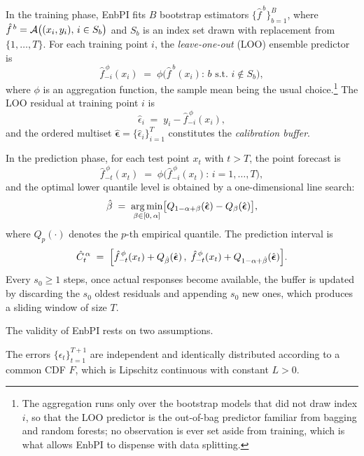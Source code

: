 In the training phase, EnbPI fits $B$ bootstrap estimators
$\{\hat{f}^{\,b}\}_{b=1}^B$, where
$\hat{f}^{\,b} = \mathcal{A}\bigl((x_i,y_i),\, i\in S_b\bigr)$ and $S_b$ is
an index set drawn with replacement from $\{1,\ldots,T\}$.
For each training point $i$, the \emph{leave-one-out} (LOO) ensemble
predictor is
\[
  \hat{f}_{-i}^{\,\phi}(x_i)
  \;=\;
  \phi\!\bigl(\hat{f}^{\,b}(x_i):\, b \text{ s.t. } i \notin S_b\bigr),
\]
where $\phi$ is an aggregation function, the sample mean being the
usual choice.\footnote{The aggregation runs only over the bootstrap
models that did not draw index $i$, so that the LOO predictor is the
out-of-bag predictor familiar from bagging and random forests; no
observation is ever set aside from training, which is what allows
EnbPI to dispense with data splitting.}
The LOO residual at training point $i$ is
\[
  \hat{\epsilon}_i \;=\; y_i - \hat{f}_{-i}^{\,\phi}(x_i),
\]
and the ordered multiset
$\hat{\boldsymbol\epsilon} = \{\hat{\epsilon}_i\}_{i=1}^T$
constitutes the \emph{calibration buffer}.

In the prediction phase, for each test point $x_t$ with $t > T$, the
point forecast is
\[
  \hat{f}_{-t}^{\,\phi}(x_t)
  \;=\;
  \phi\!\bigl(\hat{f}_{-i}^{\,\phi}(x_t):\, i = 1,\ldots,T\bigr),
\]
and the optimal lower quantile level is obtained by a
one-dimensional line search:
\[
  \hat{\beta}
  \;=\;
  \operatorname*{arg\,min}_{\beta \in [0,\,\alpha]}
  \bigl[
    Q_{1-\alpha+\beta}\!\left(\hat{\boldsymbol\epsilon}\right)
    -
    Q_{\beta}\!\left(\hat{\boldsymbol\epsilon}\right)
  \bigr],
\]
where $Q_p(\cdot)$ denotes the $p$-th empirical quantile.
The prediction interval is
%
\begin{equation}
  \label{eq:enbpi_interval}
  \hat{C}_t^{\,\alpha}
  \;=\;
  \Bigl[
    \hat{f}_{-t}^{\,\phi}(x_t)
    + Q_{\hat\beta}\!\left(\hat{\boldsymbol\epsilon}\right),\;
    \hat{f}_{-t}^{\,\phi}(x_t)
    + Q_{1-\alpha+\hat\beta}\!\left(\hat{\boldsymbol\epsilon}\right)
  \Bigr].
\end{equation}
%
Every $s_0 \geq 1$ steps, once actual responses become available, the
buffer is updated by discarding the $s_0$ oldest residuals and
appending $s_0$ new ones, which produces a sliding window of size $T$.

The validity of EnbPI rests on two assumptions.

\begin{assumption}
\label{ass:xu_a1}
The errors $\{\epsilon_t\}_{t=1}^{T+1}$ are independent and
identically distributed according to a common CDF $F$, which is
Lipschitz continuous with constant $L > 0$.
\end{assumption}

